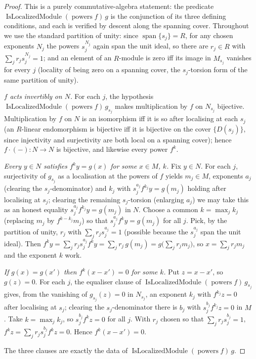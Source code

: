 \begin{proof}

  This is a purely commutative-algebra statement: the predicate
  \(\operatorname{IsLocalizedModule}(\operatorname{powers} f)\, g\) is the conjunction of its
  three defining conditions, and each is verified by descent along the spanning cover. Throughout we use the standard partition
  of unity: since \(\operatorname{span}\{s_j\} = R\), for any chosen exponents \(N_j\) the
  powers \(s_j^{N_j}\) again span the unit ideal, so there are \(r_j \in R\) with
  \(\sum_j r_j s_j^{N_j} = 1\); and an element of an \(R\)-module is zero iff its image in
  \(M_{s_j}\) vanishes for every \(j\) (locality of being zero on a spanning cover, the
  \(s_j\)-torsion form of the same partition of unity).

  \emph{\(f\) acts invertibly on \(N\).} For each \(j\), the hypothesis
  \(\operatorname{IsLocalizedModule}(\operatorname{powers} f)\, g_{s_j}\) makes multiplication
  by \(f\) on \(N_{s_j}\) bijective. Multiplication by \(f\) on \(N\) is an isomorphism iff it
  is so after localising at each \(s_j\) (an \(R\)-linear endomorphism is bijective iff it is
  bijective on the cover \(\{D(s_j)\}\), since injectivity and surjectivity are both local on
  a spanning cover); hence \(f \cdot (-) : N \to N\) is bijective, and likewise every power
  \(f^k\).

  \emph{Every \(y \in N\) satisfies \(f^k y = g(x)\) for some \(x \in M\), \(k\).}
  Fix \(y \in N\). For each \(j\), surjectivity of \(g_{s_j}\) as a localisation at the powers
  of \(f\) yields \(m_j \in M\), exponents \(a_j\) (clearing the \(s_j\)-denominator) and
  \(k_j\) with \(s_j^{a_j} f^{k_j} y = g(m_j)\) holding after localising at \(s_j\); clearing
  the remaining \(s_j\)-torsion (enlarging \(a_j\)) we may take this as an honest equality
  \(s_j^{a_j} f^{k_j} y = g(m_j)\) in \(N\). Choose a common \(k = \max_j k_j\) (replacing
  \(m_j\) by \(f^{k - k_j} m_j\)) so that \(s_j^{a_j} f^{k} y = g(m_j)\) for all \(j\). Pick,
  by the partition of unity, \(r_j\) with \(\sum_j r_j s_j^{a_j} = 1\) (possible because the
  \(s_j^{a_j}\) span the unit ideal). Then
  \(f^{k} y = \sum_j r_j s_j^{a_j} f^{k} y = \sum_j r_j\, g(m_j) = g\bigl(\sum_j r_j m_j\bigr)\),
  so \(x = \sum_j r_j m_j\) and the exponent \(k\) work.

  \emph{If \(g(x) = g(x')\) then \(f^k(x - x') = 0\) for some \(k\).} Put
  \(z = x - x'\), so \(g(z) = 0\). For each \(j\), the equaliser clause of
  \(\operatorname{IsLocalizedModule}(\operatorname{powers} f)\, g_{s_j}\) gives, from the
  vanishing of \(g_{s_j}(z) = 0\) in \(N_{s_j}\), an exponent \(k_j\) with
  \(f^{k_j} z = 0\) after localising at \(s_j\); clearing the \(s_j\)-denominator there is
  \(b_j\) with \(s_j^{b_j} f^{k_j} z = 0\) in \(M\). Take \(k = \max_j k_j\), so
  \(s_j^{b_j} f^{k} z = 0\) for all \(j\). With \(r_j\) chosen so that
  \(\sum_j r_j s_j^{b_j} = 1\),
  \(f^{k} z = \sum_j r_j s_j^{b_j} f^{k} z = 0\). Hence \(f^{k}(x - x') = 0\).

  The three clauses are exactly the data of
  \(\operatorname{IsLocalizedModule}(\operatorname{powers} f)\, g\).
\end{proof}

